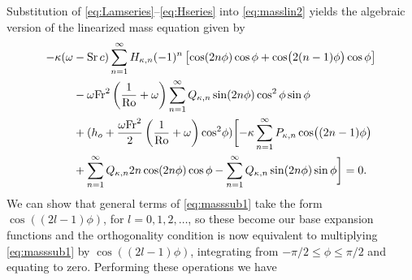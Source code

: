 Substitution of \eqref{eq:Lamseries}--\eqref{eq:Hseries} into \eqref{eq:masslin2} yields the algebraic version of the linearized mass equation given by
\begin{align}
-\kappa(\omega &- \mathrm{Sr}\,c) \sum_{n=1}^\infty H_{\kappa,n} (-1)^n \left[ \cos(2n\phi)\cos\phi+\cos\bigl(2(n-1)\phi\bigr)\cos\phi \right] \notag \\
&- \omega \mathrm{Fr}^2 \left( \frac{1}{\mathrm{Ro}}+\omega \right)\sum_{n=1}^\infty Q_{\kappa,n} \sin(2n\phi)\cos^2\phi \sin\phi  \notag \\
&+(h_o + \frac{\omega \mathrm{Fr}^2}{2}\left(\frac{1}{\mathrm{Ro}}+\omega \right)\cos^2\!\phi ) \biggl[-\kappa\sum_{n=1}^\infty P_{\kappa,n}\cos\bigl((2n-1)\phi\bigr) \notag \\
&+\sum_{n=1}^\infty Q_{\kappa,n}2n\cos(2n\phi)\cos\phi-\sum_{n=1}^\infty Q_{\kappa,n}\sin(2n\phi)\sin\phi\biggr]=0. \label{eq:masssub1}
\end{align}
We can show that general terms of \eqref{eq:masssub1} take the form $\cos((2l-1)\phi)$, for $l=0,1,2,\ldots$, so these become our base expansion functions and the orthogonality condition is now equivalent to multiplying \eqref{eq:masssub1} by $\cos((2l-1)\phi)$, integrating from $-\pi/2\le\phi\le\pi/2$ and equating to zero. Performing these operations we have
